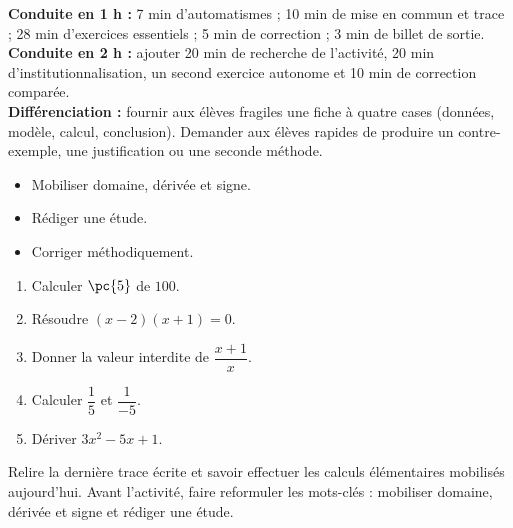 \ifmxteacher
\begin{method}
\textbf{Conduite en 1 h :} 7 min d'automatismes ; 10 min de mise en commun et trace ; 28 min d'exercices essentiels ; 5 min de correction ; 3 min de billet de sortie.\\
\textbf{Conduite en 2 h :} ajouter 20 min de recherche de l'activité, 20 min d'institutionnalisation, un second exercice autonome et 10 min de correction comparée.\\
\textbf{Différenciation :} fournir aux élèves fragiles une fiche à quatre cases (données, modèle, calcul, conclusion). Demander aux élèves rapides de produire un contre-exemple, une justification ou une seconde méthode.
\end{method}
\fi
{}
\begin{objectives}\begin{itemize}\item Mobiliser domaine, dérivée et signe.\item Rédiger une étude.\item Corriger méthodiquement.\end{itemize}\end{objectives}
\begin{fluency}\begin{enumerate}\item Calculer $\pc{5}$ de $100$. \item Résoudre $(x-2)(x+1)=0$. \item Donner la valeur interdite de $\dfrac{x+1}{x}$. \item Calculer $\dfrac1{5}$ et $\dfrac1{-5}$. \item Dériver $3x^2-5x+1$. \end{enumerate}\end{fluency}
\begin{prerequisites}Relire la dernière trace écrite et savoir effectuer les calculs élémentaires mobilisés aujourd'hui. Avant l'activité, faire reformuler les mots-clés : mobiliser domaine, dérivée et signe et rédiger une étude.\end{prerequisites}

